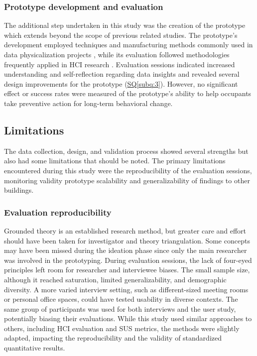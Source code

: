 \subsubsection{Prototype development and evaluation}
The additional step undertaken in this study was the creation of the prototype which extends beyond the scope of previous related studies. The prototype's development employed techniques and manufacturing methods commonly used in data physicalization projects \cite{alexander_data_2019, jansen_opportunities_2015}, while its evaluation followed methodologies frequently applied in HCI research \cite{ranasinghe_encoding_2023, sauve_physecology_2022}. Evaluation sessions indicated increased understanding and self-reflection regarding data insights and revealed several design improvements for the prototype (\hyperref[subq:2]{SQ\ref*{subq:3}}). However, no significant effect or success rates were measured of the prototype's ability to help occupants take preventive action for long-term behavioral change.

\subsection{Limitations}

The data collection, design, and validation process showed several strengths but also had some limitations that should be noted. The primary limitations encountered during this study were the reproducibility of the evaluation sessions, monitoring validity prototype scalability and generalizability of findings to other buildings.

\subsubsection{Evaluation reproducibility}

Grounded theory is an established research method, but greater care and effort should have been taken for investigator and theory triangulation. Some concepts may have been missed during the ideation phase since only the main researcher was involved in the prototyping. During evaluation sessions, the lack of four-eyed principles left room for researcher and interviewee biases. The small sample size, although it reached saturation, limited generalizability, and demographic diversity. A more varied interview setting, such as different-sized meeting rooms or personal office spaces, could have tested usability in diverse contexts. The same group of participants was used for both interviews and the user study, potentially biasing their evaluations. While this study used similar approaches to others, including HCI evaluation and SUS metrics, the methods were slightly adapted, impacting the reproducibility and the validity of standardized quantitative results. 

